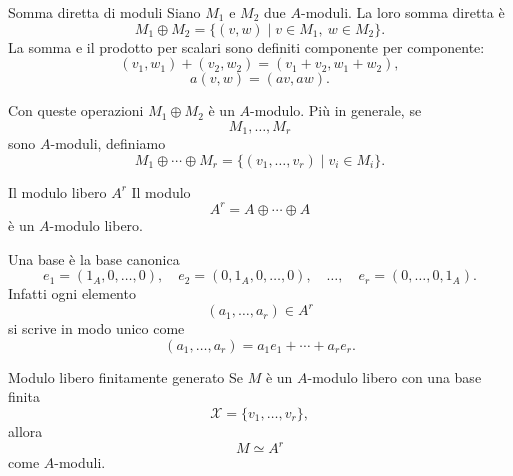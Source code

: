 \documentclass[a4paper]{article}
\begin{document}
\begin{radioactive}
\begin{snippetdefinition}{Somma diretta di moduli}
    Siano \(M_1\) e \(M_2\) due \(A\)-moduli. La loro somma diretta è
    \[
        M_1\oplus M_2
        =
        \{(v,w)\mid v\in M_1,\ w\in M_2\}.
    \]
    La somma e il prodotto per scalari sono definiti componente per componente:
    \[
        (v_1,w_1)+(v_2,w_2)
        =
        (v_1+v_2,w_1+w_2),
    \]
    \[
        a(v,w)=(av,aw).
    \]
\end{snippetdefinition}
\end{radioactive}

\begin{radioactive}
Con queste operazioni \(M_1\oplus M_2\) è un \(A\)-modulo. Più in generale, se
\[
    M_1,\ldots,M_r
\]
sono \(A\)-moduli, definiamo
\[
    M_1\oplus\cdots\oplus M_r
    =
    \{(v_1,\ldots,v_r)\mid v_i\in M_i\}.
\]
\end{radioactive}

\begin{radioactive}
\begin{snippetexample}{Il modulo libero \(A^r\)}
    Il modulo
    \[
        A^r=A\oplus\cdots\oplus A
    \]
    è un \(A\)-modulo libero.

    Una base è la base canonica
    \[
        e_1=(1_A,0,\ldots,0),
        \quad
        e_2=(0,1_A,0,\ldots,0),
        \quad
        \ldots,
        \quad
        e_r=(0,\ldots,0,1_A).
    \]
    Infatti ogni elemento
    \[
        (a_1,\ldots,a_r)\in A^r
    \]
    si scrive in modo unico come
    \[
        (a_1,\ldots,a_r)
        =
        a_1e_1+\cdots+a_re_r.
    \]
\end{snippetexample}
\end{radioactive}

\begin{radioactive}
\begin{snippetcorollary}{Modulo libero finitamente generato}
    Se \(M\) è un \(A\)-modulo libero con una base finita
    \[
        \mathcal{X}=\{v_1,\ldots,v_r\},
    \]
    allora
    \[
        M\simeq A^r
    \]
    come \(A\)-moduli.
\end{snippetcorollary}
\end{radioactive}
\end{document}
